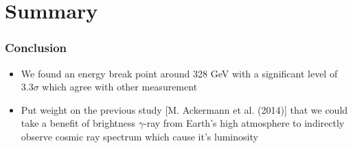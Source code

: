 \documentclass{beamer}
\begin{document}



\section{Summary}
\begin{frame}
\frametitle{Conclusion}
\begin{itemize}
\item We found an energy break point around 328 GeV with a significant level of 3.3$\sigma$ which agree with other measurement
\item Put weight on the previous study [M. Ackermann et al. (2014)] that we could take a benefit of brightness $\gamma$-ray from Earth’s high atmosphere to indirectly observe cosmic ray spectrum which cause it's luminosity
\end{itemize}
\end{frame}
\end{document}
